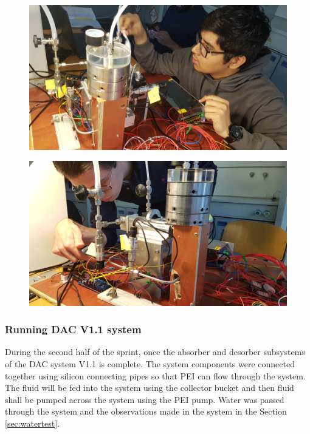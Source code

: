 \begin{figure}[H]
\centering
\begin{minipage}{.5\textwidth}
  \centering
  \includegraphics[width=0.9\linewidth]{images/mywork/Sprint2/Leaktest.jpg}
  \label{fig:leaktest}
\end{minipage}%
\begin{minipage}{.5\textwidth}
  \centering
  \includegraphics[width=0.9\linewidth]{images/mywork/Sprint2/desorbcheck.jpg}
  \label{fig:desorber}
\end{minipage}
\end{figure}


\subsubsection{Running DAC V1.1 system}

During the second half of the sprint, once the absorber and desorber subsystems of the DAC system V1.1 is complete. The system components were connected together using silicon connecting pipes so that PEI can flow through the system. The fluid will be fed into the system using the collector bucket and then fluid shall be pumped across the system using the PEI pump. Water was passed through the system and the observations made in the system in the Section \ref{sec:watertest}. 
\bigbreak



